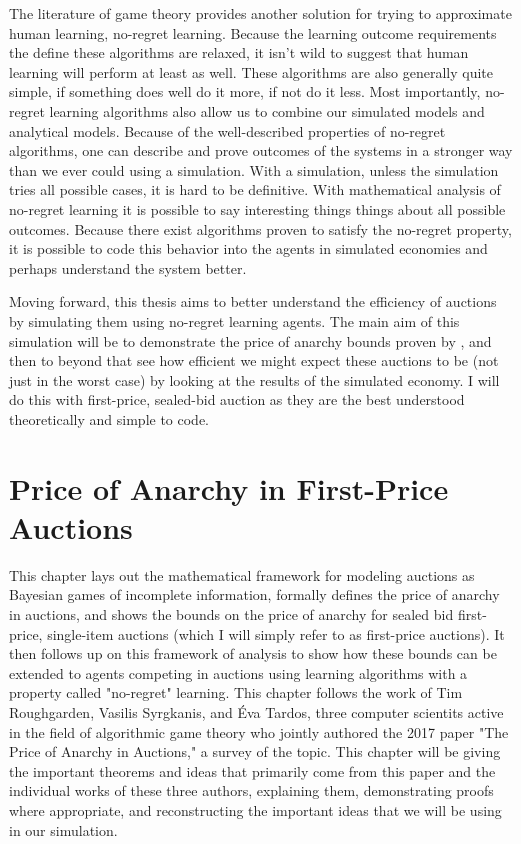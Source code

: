 \documentclass[12pt,twoside]{reedthesis}
\begin{document}

The literature of game theory provides another solution for trying to approximate human learning, no-regret learning. Because the learning outcome requirements the define these algorithms are relaxed, it isn't wild to suggest that human learning will perform at least as well. These algorithms are also generally quite simple, if something does well do it more, if not do it less. Most importantly, no-regret learning algorithms also allow us to combine our simulated models and analytical models. Because of the well-described properties of no-regret algorithms, one can describe and prove outcomes of the systems in a stronger way than we ever could using a simulation. With a simulation, unless the simulation tries all possible cases, it is hard to be definitive. With mathematical analysis of no-regret learning it is possible to say interesting things things about all possible outcomes. Because there exist algorithms proven to satisfy the no-regret property, it is possible to code this behavior into the agents in simulated economies and perhaps understand the system better.

Moving forward, this thesis aims to better understand the efficiency of auctions by simulating them using no-regret learning agents. The main aim of this simulation will be to demonstrate the price of anarchy bounds proven by \cite{Roughgarden2017}, and then to beyond that see how efficient we might expect these auctions to be (not just in the worst case) by looking at the results of the simulated economy. I will do this with first-price, sealed-bid auction as they are the best understood theoretically and simple to code.

\chapter{Price of Anarchy in First-Price Auctions}
This chapter lays out the mathematical framework for modeling auctions as Bayesian games of incomplete information, formally defines the price of anarchy in auctions, and shows the bounds on the price of anarchy for sealed bid first-price, single-item auctions (which I will simply refer to as first-price auctions). It then follows up on this framework of analysis to show how these bounds can be extended to agents competing in auctions using learning algorithms with a property called "no-regret" learning. This chapter follows the work of Tim Roughgarden, Vasilis Syrgkanis, and \'Eva Tardos, three computer scientits active in the field of algorithmic game theory who jointly authored the 2017 paper "The Price of Anarchy in Auctions," a survey of the topic. This chapter will be giving the important theorems and ideas that primarily come from this paper and the individual works of these three authors, explaining them, demonstrating proofs where appropriate, and reconstructing the important ideas that we will be using in our simulation. 
\end{document}
